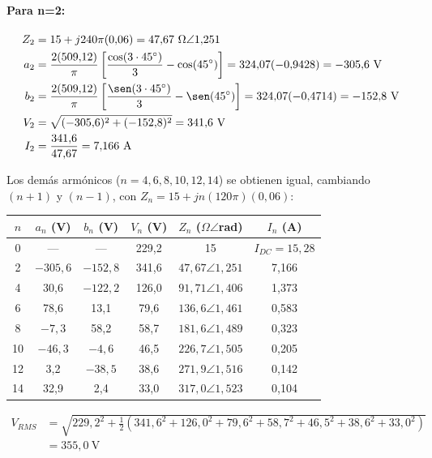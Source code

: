 \documentclass[11pt]{article}
\begin{document}
\paragraph{Para n=2:}
\begin{align*}
Z_2 &= 15 + j240\pi(0{,}06) = 47{,}67\ \Omega\angle 1{,}251 \\
a_2 &= \frac{2(509{,}12)}{\pi}\left[\frac{\cos(3\cdot45^\circ)}{3} - \cos(45^\circ)\right] = 324{,}07(-0{,}9428) = -305{,}6\ \text{V} \\
b_2 &= \frac{2(509{,}12)}{\pi}\left[\frac{\sen(3\cdot45^\circ)}{3} - \sen(45^\circ)\right] = 324{,}07(-0{,}4714) = -152{,}8\ \text{V} \\
V_2 &= \sqrt{(-305{,}6)^2+(-152{,}8)^2} = 341{,}6\ \text{V} \\
I_2 &= \frac{341{,}6}{47{,}67} = 7{,}166\ \text{A}
\end{align*}

Los dem\'as arm\'onicos ($n=4,6,8,10,12,14$) se obtienen igual, cambiando
$(n+1)$ y $(n-1)$, con $Z_n=15+jn(120\pi)(0{,}06)$:

\begin{center}
\begin{tabular}{c c c c c c}
$n$ & $a_n$ (V) & $b_n$ (V) & $V_n$ (V) & $Z_n$ ($\Omega\angle$rad) & $I_n$ (A) \\ \hline
0 & --- & --- & 229{,}2 & 15 & $I_{DC}=15{,}28$ \\
2 & $-305{,}6$ & $-152{,}8$ & 341{,}6 & $47{,}67\angle1{,}251$ & 7{,}166 \\
4 & 30{,}6 & $-122{,}2$ & 126{,}0 & $91{,}71\angle1{,}406$ & 1{,}373 \\
6 & 78{,}6 & 13{,}1 & 79{,}6 & $136{,}6\angle1{,}461$ & 0{,}583 \\
8 & $-7{,}3$ & 58{,}2 & 58{,}7 & $181{,}6\angle1{,}489$ & 0{,}323 \\
10 & $-46{,}3$ & $-4{,}6$ & 46{,}5 & $226{,}7\angle1{,}505$ & 0{,}205 \\
12 & 3{,}2 & $-38{,}5$ & 38{,}6 & $271{,}9\angle1{,}516$ & 0{,}142 \\
14 & 32{,}9 & 2{,}4 & 33{,}0 & $317{,}0\angle1{,}523$ & 0{,}104 \\
\end{tabular}
\end{center}

\begin{align*}
V_{RMS} &= \sqrt{229{,}2^2 + \tfrac{1}{2}\left(341{,}6^2+126{,}0^2+79{,}6^2+58{,}7^2+46{,}5^2+38{,}6^2+33{,}0^2\right)} \\
        &= \boxed{355{,}0\ \text{V}}
\end{align*}
\end{document}
